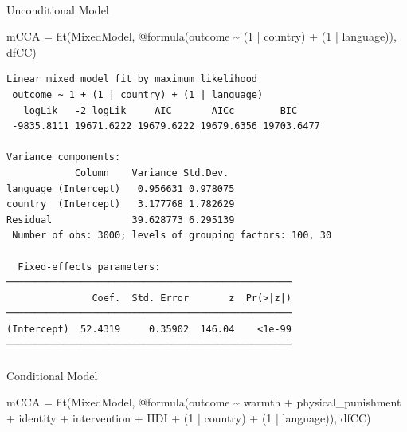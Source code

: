 \documentclass[
  letterpaper,
  DIV=11,
  numbers=noendperiod]{scrreprt}
\makeatletter
\let\oldparagraph\paragraph
\renewcommand{\paragraph}{
    \@ifstar
      \xxxParagraphStar
      \xxxParagraphNoStar
  }
\newcommand{\xxxParagraphStar}[1]{\oldparagraph*{#1}\mbox{}}
\newcommand{\xxxParagraphNoStar}[1]{\oldparagraph{#1}\mbox{}}
\newenvironment{Shaded}{\begin{snugshade}}{\end{snugshade}}
\newcommand{\FloatTok}[1]{\textcolor[rgb]{0.68,0.00,0.00}{#1}}
\newcommand{\FunctionTok}[1]{\textcolor[rgb]{0.28,0.35,0.67}{#1}}
\newcommand{\NormalTok}[1]{\textcolor[rgb]{0.00,0.23,0.31}{#1}}
\newcommand{\OperatorTok}[1]{\textcolor[rgb]{0.37,0.37,0.37}{#1}}
\newcommand{\PreprocessorTok}[1]{\textcolor[rgb]{0.68,0.00,0.00}{#1}}
\makeatother
\begin{document}
\paragraph{Unconditional Model}\label{unconditional-model-5}

\begin{Shaded}
\begin{Highlighting}[]
\NormalTok{mCCA }\OperatorTok{=} \FunctionTok{fit}\NormalTok{(MixedModel, }\PreprocessorTok{@formula}\NormalTok{(outcome }\OperatorTok{\textasciitilde{}} 
\NormalTok{                                 (}\FloatTok{1} \OperatorTok{|}\NormalTok{ country) }\OperatorTok{+} 
\NormalTok{                                 (}\FloatTok{1} \OperatorTok{|}\NormalTok{ language)), dfCC)}
\end{Highlighting}
\end{Shaded}

\begin{verbatim}
Linear mixed model fit by maximum likelihood
 outcome ~ 1 + (1 | country) + (1 | language)
   logLik   -2 logLik     AIC       AICc        BIC    
 -9835.8111 19671.6222 19679.6222 19679.6356 19703.6477

Variance components:
            Column    Variance Std.Dev. 
language (Intercept)   0.956631 0.978075
country  (Intercept)   3.177768 1.782629
Residual              39.628773 6.295139
 Number of obs: 3000; levels of grouping factors: 100, 30

  Fixed-effects parameters:
──────────────────────────────────────────────────
               Coef.  Std. Error       z  Pr(>|z|)
──────────────────────────────────────────────────
(Intercept)  52.4319     0.35902  146.04    <1e-99
──────────────────────────────────────────────────
\end{verbatim}

\paragraph{Conditional Model}\label{conditional-model-5}

\begin{Shaded}
\begin{Highlighting}[]
\NormalTok{mCCA }\OperatorTok{=} \FunctionTok{fit}\NormalTok{(MixedModel, }\PreprocessorTok{@formula}\NormalTok{(outcome }\OperatorTok{\textasciitilde{}}\NormalTok{ warmth }\OperatorTok{+} 
\NormalTok{                                 physical\_punishment }\OperatorTok{+} 
\NormalTok{                                 identity }\OperatorTok{+}\NormalTok{ intervention }\OperatorTok{+} 
\NormalTok{                                 HDI }\OperatorTok{+}
\NormalTok{                                 (}\FloatTok{1} \OperatorTok{|}\NormalTok{ country) }\OperatorTok{+} 
\NormalTok{                                 (}\FloatTok{1} \OperatorTok{|}\NormalTok{ language)), dfCC)}
\end{Highlighting}
\end{Shaded}
\end{document}
